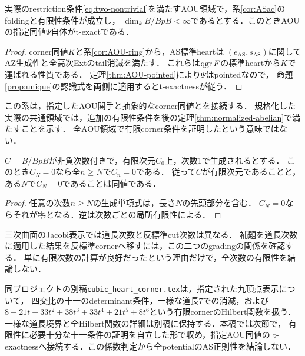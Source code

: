\begin{corollary}\label{cor:AOU-texact}
実際のrestriction条件\eqref{eq:two-nontrivial}を満たすAOU領域で，系\ref{cor:ASac}のfoldingと有限性条件が成立し，
$\dim_k B/BpB<\infty$であるとする．このときAOUの指定同値$\Psi$自体がt-exactである．
\end{corollary}
\begin{proof}
corner同値$K$と系\ref{cor:AOU-ring}から，AS標準heartは
$(e_{\mathrm{AS}},s_{\mathrm{AS}})$に関してAZ生成性と全高次Extのtail消滅を満たす．
これらは$\operatorname{qgr} F$の標準heartから$K$で運ばれる性質である．
定理\ref{thm:AOU-pointed}により$\Psi$はpointedなので，
命題\ref{prop:unique}の認識式を両側に適用するとt-exactnessが従う．
\end{proof}
この系は，指定したAOU関手と抽象的なcorner同値とを接続する．
規格化した実際の共通領域では，追加の有限性条件を後の定理\ref{thm:normalized-abelian}で満たすことを示す．
全AOU領域で有限corner条件を証明したという意味ではない．

\begin{lemma}[有限次数による判定が有効になる条件]\label{lem:cutoff}
$C=B/BpB$が非負次数付きで，有限次元$C_0$上，次数1で生成されるとする．
このとき$C_N=0$なら全$n\ge N$で$C_n=0$である．
従って$C$が有限次元であることと，ある$N$で$C_N=0$であることは同値である．
\end{lemma}
\begin{proof}
任意の次数$n\ge N$の生成単項式は，長さ$N$の先頭部分を含む．
$C_N=0$ならそれが零となる．逆は次数ごとの局所有限性による．
\end{proof}
三次曲面のJacobi表示では道長次数と反標準cut次数は異なる．
補題を道長次数に適用した結果を反標準cornerへ移すには，この二つのgradingの関係を確認する．
単に有限次数の計算が良好だったという理由だけで，全次数の有限性を結論しない．

\begin{remark}[三次曲面の具体的corner計算との関係]
同プロジェクトの別稿\nolinkurl{cubic_heart_corner.tex}は，指定された九頂点表示について，
四交比の十一のdeterminant条件，一様な道長7での消滅，および
$8+21t+33t^2+38t^3+33t^4+21t^5+8t^6$という有限cornerのHilbert関数を扱う．
一様な道長境界と全Hilbert関数の詳細は別稿に保持する．本稿では次節で，
有限性に必要十分な十一条件の証明を自立した形で収め，指定AOU同値の
t-exactnessへ接続する．この係数判定から全potentialのAS正則性を結論しない．
\end{remark}

